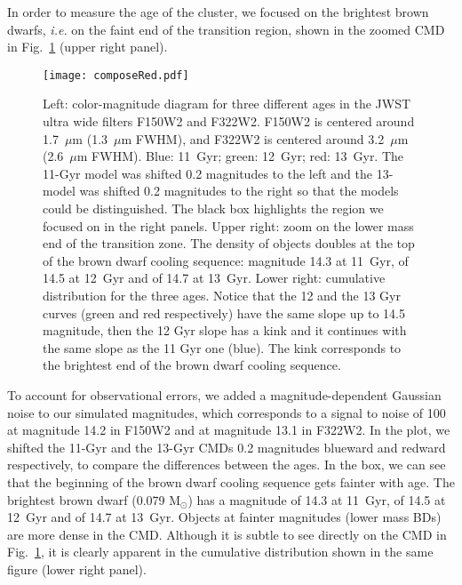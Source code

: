 \documentclass[useAMS,usenatbib]{mnras}
\begin{document}
In order to measure the age of the cluster, we focused on the brightest brown dwarfs, {\em i.e.} on the faint end of the transition region, shown in the zoomed CMD in Fig.~\ref{fig:3_cmd} (upper right panel).
\begin{figure}
\texttt{[image: composeRed.pdf]}
\caption{Left: color-magnitude diagram for three different ages in the JWST ultra wide filters F150W2 and F322W2. F150W2 is centered around 1.7~$\mu$m (1.3~$\mu$m FWHM), and F322W2 is centered around 3.2~$\mu$m (2.6~$\mu$m FWHM). Blue: 11~Gyr; green: 12~Gyr; red: 13~Gyr. The 11-Gyr model was shifted 0.2 magnitudes to the left and the 13-model was shifted 0.2 magnitudes to the right so that the models could be distinguished. The black box highlights the region we focused on in the right panels. Upper right: zoom on the lower mass end of the transition zone.  The density of objects doubles at the top of the brown dwarf cooling sequence: magnitude 14.3 at 11~Gyr, of 14.5 at 12~Gyr and of 14.7 at 13~Gyr. Lower right: cumulative distribution for the three ages. Notice that the 12 and the 13 Gyr curves (green and red respectively) have the same slope up to 14.5 magnitude, then the 12 Gyr slope has a kink and it continues with the same slope as the 11 Gyr one (blue). The kink corresponds to the brightest end of the brown dwarf cooling sequence.}
\label{fig:3_cmd}
\end{figure}
To account for observational errors, we added a magnitude-dependent Gaussian noise to our simulated magnitudes, which corresponds to a signal to noise of 100 at magnitude 14.2 in F150W2 and at magnitude 13.1 in F322W2. In the plot, we shifted the 11-Gyr and the 13-Gyr CMDs 0.2 magnitudes blueward and redward respectively, to compare the differences between the ages.  In the box, we can see that the beginning of the brown dwarf cooling sequence gets fainter with age. The brightest brown dwarf (0.079 M$_\odot$) has a magnitude of 14.3 at 11~Gyr, of 14.5 at 12~Gyr and of 14.7 at 13~Gyr. Objects at fainter magnitudes (lower mass BDs) are more dense in the CMD.  Although it is subtle to see directly on the CMD in Fig.~\ref{fig:3_cmd}, it is clearly apparent in the cumulative distribution shown in the same figure (lower right panel).
\end{document}
